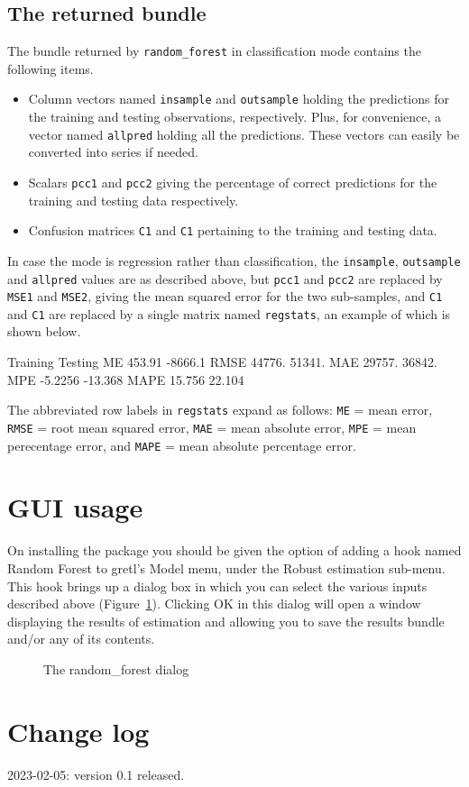 \documentclass{article}
\begin{document}
\subsection{The returned bundle}

The bundle returned by \texttt{random\_forest} in classification mode
contains the following items.
\begin{itemize}
\item Column vectors named \texttt{insample} and \texttt{outsample}
  holding the predictions for the training and testing observations,
  respectively. Plus, for convenience, a vector named \texttt{allpred}
  holding all the predictions. These vectors can easily be converted
  into series if needed.
\item Scalars \texttt{pcc1} and \texttt{pcc2} giving the percentage of
  correct predictions for the training and testing data respectively.
\item Confusion matrices \texttt{C1} and \texttt{C1} pertaining to the
  training and testing data.
\end{itemize}

In case the mode is regression rather than classification, the
\texttt{insample}, \texttt{outsample} and \texttt{allpred} values are
as described above, but \texttt{pcc1} and \texttt{pcc2} are replaced
by \texttt{MSE1} and \texttt{MSE2}, giving the mean squared error for
the two sub-samples, and \texttt{C1} and \texttt{C1} are replaced by a
single matrix named \texttt{regstats}, an example of which is shown
below.
%
\begin{code}
         Training      Testing 
  ME       453.91      -8666.1 
RMSE       44776.       51341. 
 MAE       29757.       36842. 
 MPE      -5.2256      -13.368 
MAPE       15.756       22.104
\end{code}
%
The abbreviated row labels in \texttt{regstats} expand as follows:
\texttt{ME} = mean error, \texttt{RMSE} = root mean squared error,
\texttt{MAE} = mean absolute error, \texttt{MPE} = mean perecentage
error, and \texttt{MAPE} = mean absolute percentage error.


\section{GUI usage}

On installing the package you should be given the option of adding a
hook named \textsf{Random Forest} to gretl's \textsf{Model} menu, under
the \textsf{Robust estimation} sub-menu. This hook brings up a
dialog box in which you can select the various inputs described above
(Figure~\ref{fig:dialog}). Clicking \textsf{OK} in this dialog will
open a window displaying the results of estimation and allowing you to
save the results bundle and/or any of its contents.

\begin{figure}[htbp]
  \centering
  \caption{The random\_forest dialog}
  \label{fig:dialog}
\end{figure}

\section*{Change log}

2023-02-05: version 0.1 released.
\end{document}
